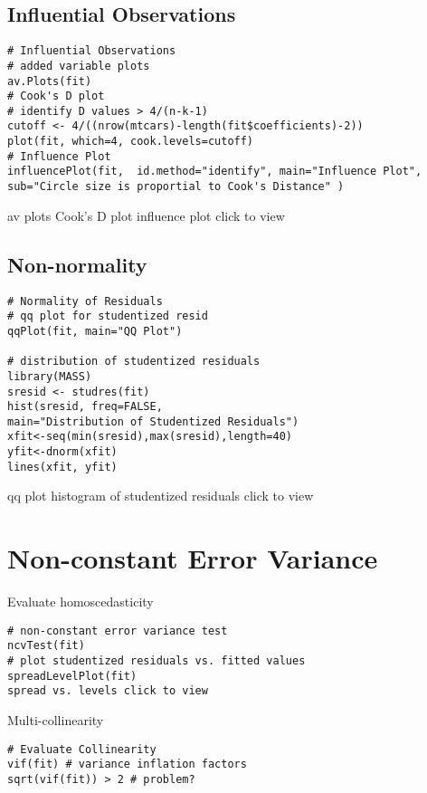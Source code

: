 \documentclass{article}
\begin{document}
\subsection{Influential Observations}

\begin{framed}
\begin{verbatim}
# Influential Observations
# added variable plots 
av.Plots(fit)
# Cook's D plot
# identify D values > 4/(n-k-1) 
cutoff <- 4/((nrow(mtcars)-length(fit$coefficients)-2)) 
plot(fit, which=4, cook.levels=cutoff)
# Influence Plot 
influencePlot(fit,	id.method="identify", main="Influence Plot", sub="Circle size is proportial to Cook's Distance" )
\end{verbatim}
\end{framed}
av plots Cook's D plot influence plot click to view
\subsection{Non-normality}
\begin{framed}
\begin{verbatim}
# Normality of Residuals
# qq plot for studentized resid
qqPlot(fit, main="QQ Plot")

# distribution of studentized residuals
library(MASS)
sresid <- studres(fit) 
hist(sresid, freq=FALSE, 
main="Distribution of Studentized Residuals")
xfit<-seq(min(sresid),max(sresid),length=40) 
yfit<-dnorm(xfit) 
lines(xfit, yfit)
\end{verbatim}
\end{framed}
qq plot histogram of studentized residuals click to view
\section{Non-constant Error Variance}

Evaluate homoscedasticity
\begin{framed}
\begin{verbatim}
# non-constant error variance test
ncvTest(fit)
# plot studentized residuals vs. fitted values 
spreadLevelPlot(fit)
spread vs. levels click to view
\end{verbatim}
\end{framed}
Multi-collinearity
\begin{framed}
\begin{verbatim}
# Evaluate Collinearity
vif(fit) # variance inflation factors 
sqrt(vif(fit)) > 2 # problem?
\end{verbatim}
\end{framed}
\end{document}
